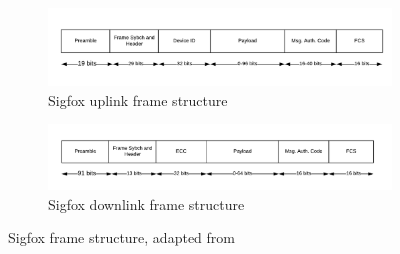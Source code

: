 \documentclass[12pt]{article}
\begin{document}
\begin{figure}[h]
\begin{subfigure}[t]{\columnwidth}
  \centering
  \includegraphics[width=.8\columnwidth]{Images/SigfoxUplinkFrame.pdf}  \caption{Sigfox uplink frame structure }
\end{subfigure}

\begin{subfigure}[t]{\columnwidth}
  \centering
  \includegraphics[width=0.8\columnwidth]{Images/SigfoxDownlinkFrame.pdf}  
  \caption{Sigfox downlink frame structure}
\end{subfigure}

\caption{Sigfox frame structure, adapted from \cite{gomez2019sigfox,farrell2018low}}
\label{Fig:Sigfox frame structure}
\end{figure}


\begin{table}[]
\caption{Sigfox offerings and limitations across it's subscription plans \cite{finnegan2018analysis}}
\centering
{}

\label{sigfoxplan}
\end{table}
\end{document}
